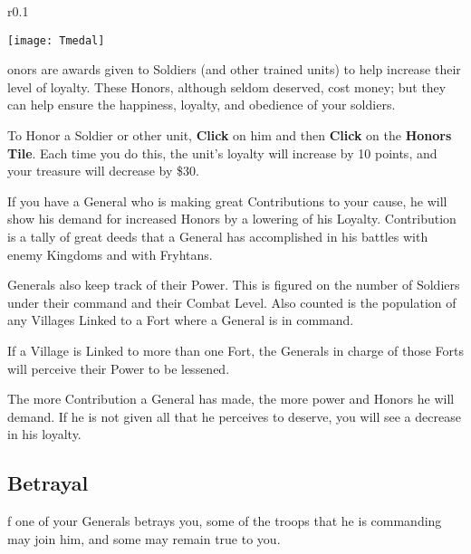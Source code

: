 
\begin{wrapfigure}{r}{0.1\textwidth}
    \vspace{-20pt}
    \begin{center}
        \texttt{[image: Tmedal]}
    \end{center}
    \vspace{-20pt}
\end{wrapfigure}


onors are awards given to Soldiers (and other trained units) to help increase their level of loyalty. These Honors, although seldom deserved, cost money; but they can help ensure the happiness, loyalty, and obedience of your soldiers.

To Honor a Soldier or other unit, \textbf{Click} on him and then \textbf{Click} on the \textbf{Honors Tile}. Each time you do this, the unit’s loyalty will increase by 10 points, and your treasure will decrease by \$30.

If you have a General who is making great Contributions to your cause, he will show his demand for increased Honors by a lowering of his Loyalty. Contribution is a tally of great deeds that a General has accomplished in his battles with enemy Kingdoms and with Fryhtans.

Generals also keep track of their Power. This is figured on the number of Soldiers under their command and their Combat Level. Also counted is the population of any Villages Linked to a Fort where a General is in command.

If a Village is Linked to more than one Fort, the Generals in charge of those Forts will perceive their Power to be lessened.

The more Contribution a General has made, the more power and Honors he will demand. If he is not given all that he perceives to deserve, you will see a decrease in his loyalty.

\subsection{\textsf{Betrayal}}


f one of your Generals betrays you, some of the troops that he is commanding may join him, and some may remain true to you.

